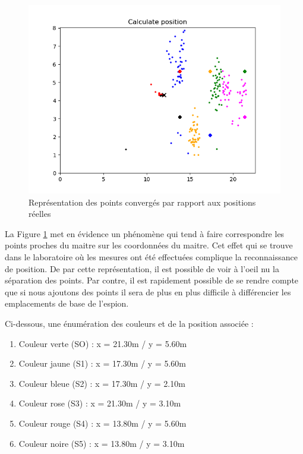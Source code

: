 \begin{figure}[htp]
 \begin{center}
  \includegraphics[scale=0.8]{figures/plot_pos_conv.PNG}
  \caption{Représentation des points convergés par rapport aux positions réelles}
  \label{fig:plotPosConv} %
 \end{center}
\end{figure}

La Figure \ref{fig:plotPosConv} met en évidence un phénomène qui tend à faire correspondre les points proches du maitre sur les coordonnées du maitre. Cet effet qui se trouve dans le laboratoire où les mesures ont été effectuées complique la reconnaissance de position. De par cette représentation, il est possible de voir à l'oeil nu la séparation des points. Par contre, il est rapidement possible de se rendre compte que si nous ajoutons des points il sera de plus en plus difficile à différencier les emplacements de base de l'espion.

Ci-dessous, une énumération des couleurs et de la position associée : 
\begin{enumerate}
 \item Couleur verte (SO) : x = 21.30m / y = 5.60m
 \item Couleur jaune (S1)  : x = 17.30m / y = 5.60m
 \item Couleur bleue (S2) : x = 17.30m / y = 2.10m
 \item Couleur rose (S3) : x = 21.30m / y = 3.10m
 \item Couleur rouge (S4) : x = 13.80m / y = 5.60m 
 \item Couleur noire (S5) : x = 13.80m / y = 3.10m 
\end{enumerate} 

